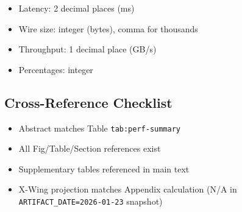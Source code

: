 \begin{itemize}\tightlist
\item Latency: 2 decimal places (ms)
\item Wire size: integer (bytes), comma for thousands
\item Throughput: 1 decimal place (GB/s)
\item Percentages: integer
\end{itemize}

\subsection*{Cross-Reference Checklist}

\begin{itemize}\tightlist
\item[\checkmark] Abstract matches Table \texttt{tab:perf-summary}
\item[\checkmark] All Fig/Table/Section references exist
\item[\checkmark] Supplementary tables referenced in main text
\item[\ ] X-Wing projection matches Appendix calculation (N/A in \texttt{ARTIFACT\_DATE=2026-01-23} snapshot)
\end{itemize}
